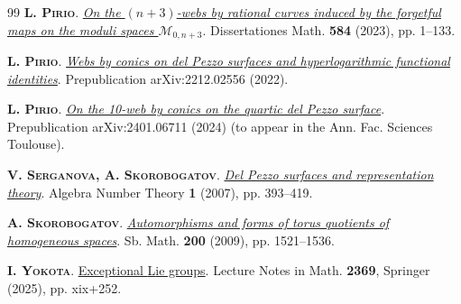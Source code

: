 \documentclass[11pt]{amsart}
\newcommand{\mk}{\medskip}
\begin{document}
\begin{thebibliography}{99}
{\scshape  \bf L. Pirio}.  
   \href{https://www.impan.pl/get/doi/10.4064/dm866-2-2023}{\it On the $(n+3)$-webs by rational curves induced by the forgetful maps on the moduli spaces $\mathcal M_{0,n+3}$}.  Dissertationes Math.  {\bf 584} (2023), pp. 1--133. 
\mk 





{\scshape  \bf L. Pirio}.  
   \href{https://arxiv.org/pdf/2212.02556}
   {\it Webs by conics on del Pezzo surfaces and hyperlogarithmic functional identities}.  Prepublication   arXiv:2212.02556 (2022).
\mk



{\scshape  \bf L. Pirio}.  
   \href{https://arxiv.org/abs/2401.06711}
   {\it On the 10-web by conics on the quartic del Pezzo surface}.  
Prepublication  arXiv:2401.06711 (2024) (to appear in the Ann. Fac. Sciences Toulouse). 
\mk 


{\scshape  \bf V. Serganova, A. Skorobogatov}.  
 \href{https://doi.org/10.2140/ant.2007.1.393}{\it Del Pezzo surfaces and representation theory}.  Algebra Number Theory {\bf 1}   (2007),  pp. 393--419.
\mk 


{\scshape  \bf  A. Skorobogatov}.  
 \href{https://doi.org/10.1070/SM2009v200n10ABEH004048}{\it 
Automorphisms and forms of torus quotients of homogeneous spaces}.
Sb. Math. {\bf 200} (2009), pp. 1521--1536.
\mk


{\scshape  \bf  I. Yokota}.  
 \href{https://doi.org/10.1007/978-3-031-88911-0}{Exceptional {L}ie groups}.
{Lecture Notes in Math.}  {\bf 2369}, {Springer} (2025), pp. xix+252. 
\mk





\end{thebibliography}
\end{document}
